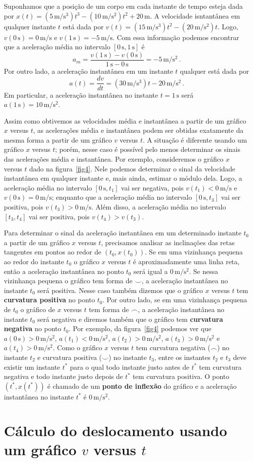 \documentclass[12pt, a4paper]{article}
\newcommand{\un}[1]{\mathrm{#1}}
\begin{document}
Suponhamos que a posição de um corpo em cada instante de tempo esteja dada por $x(t)=(5\,\un m/\un{s}^3)t^3-(10\,\un m/\un {s}^2)t^2+20\,\un m$. A velocidade isntantânea em qualquer instante $t$ está dada por $v(t)=(15\,\un m/\un{s}^3)t^2-(20\,\un m/\un{s}^2)t$. Logo, $v(0\,\un s)=0\,\un m/\un s$ e $v(1\,\un s)=-5\,\un m/\un s$. Com essa informação podemos encontrar que a aceleração média no intervalo $[0\,\un s,1\,\un s]$ é
$$a_m=\frac{v(1\,\un s)-v(0\,\un s)}{1\,\un s-0\,\un s}=-5\,\un m/\un{s}^2\,.$$
Por outro lado, a aceleração instantânea em um instante $t$ qualquer está dada por
$$a(t)=\frac{dv}{dt}=(30\,\un m/\un{s}^3)t-20\,\un m/\un{s}^2\,.$$
Em particular, a aceleração instantânea no instante $t=1\,\un s$ será $a(1\,\un s)=10\,\un m/\un{s}^2$.

Assim como obtivemos as velocidades média e instantânea a partir de um gráfico $x$ versus $t$, as acelerações média e instantânea podem ser obtidas exatamente da mesma forma a partir de um gráfico $v$ versus $t$. A situação é diferente usando um gráfico $x$ versus $t$; porém, nesse caso é possível pelo menos determinar os sinais das acelerações média e instantânea. Por exemplo, consideremos o gráfico $x$ versus $t$ dado na figura~\ref{fig4}. Nele podemos determinar o sinal da velocidade instantânea em qualquer instante e, mais ainda, estimar o módulo dela. Logo, a aceleração média no intervalo $[0\,\un s,t_1]$ vai ser negativa, pois $v(t_1)<0\,\un m/\un s$ e $v(0\,\un s)=0\,\un m/\un s$; enquanto que a aceleração média no intervalo $[0\,\un s,t_3]$ vai ser positiva, pois $v(t_3)>0\,\un m/\un s$. Além disso, a aceleração média no intervalo $[t_3,t_4]$ vai ser positiva, pois $v(t_4)>v(t_3)$.

Para determinar o sinal da aceleração instantânea em um determinado instante $t_0$ a partir de um gráfico $x$ versus $t$, precisamos analisar as inclinações das retas tangentes em pontos ao redor de $(t_0,x(t_0))$. Se em uma vizinhança pequena ao redor do instante $t_0$ o gráfico $x$ versus $t$ é aproximadamente uma linha reta, então a aceleração instantânea no ponto $t_0$ será igual a $0\,\un m/\un{s}^2$. Se nessa vizinhança pequena o gráfico tem forma de $\smile$, a aceleração instantânea no instante $t_0$ será positiva. Nesse caso também dizemos que o gráfico $x$ versus $t$ tem \textbf{curvatura positiva} no ponto $t_0$. Por outro lado, se em uma vizinhança pequena de $t_0$ o gráfico de $x$ versus $t$ tem forma de $\frown$, a aceleração instantânea no instante $t_0$ será negativa e diremos também que o gráfico tem \textbf{curvatura negativa} no ponto $t_0$. Por exemplo, da figura~\ref{fig4} podemos ver que $a(0\,\un s)>0\,\un m/\un{s}^2$, $a(t_1)<0\,\un m/\un{s}^2$, $a(t_2)>0\,\un m/\un{s}^2$, $a(t_3)>0\,\un m/\un{s}^2$ e $a(t_4)>0\,\un m/\un{s}^2$. Como o gráfico $x$ versus $t$ tem curvatura negativa ($\frown$) no instante $t_2$ e curvatura positiva ($\smile$) no instante $t_3$, entre os instantes $t_2$ e $t_3$ deve existir um instante $t^*$ para o qual todo instante justo antes de $t^*$ tem curvatura negativa e todo instante justo depois de $t^*$ tem curvatura positiva. O ponto $(t^*,x(t^*))$ é chamado de um \textbf{ponto de inflexão} do gráfico e a aceleração instantânea no instante $t^*$ é $0\,\un m/\un{s}^2$.

\section{Cálculo do deslocamento usando um gráfico $v$ versus $t$}
\end{document}
